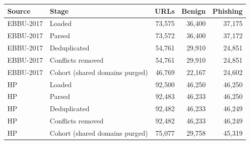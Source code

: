 \begin{tabular}{llrrr}
\toprule
Source & Stage & URLs & Benign & Phishing \\
\midrule
EBBU-2017 & Loaded & 73,575 & 36,400 & 37,175 \\
EBBU-2017 & Parsed & 73,572 & 36,400 & 37,172 \\
EBBU-2017 & Deduplicated & 54,761 & 29,910 & 24,851 \\
EBBU-2017 & Conflicts removed & 54,761 & 29,910 & 24,851 \\
EBBU-2017 & Cohort (shared domains purged) & 46,769 & 22,167 & 24,602 \\
\midrule
HP & Loaded & 92,500 & 46,250 & 46,250 \\
HP & Parsed & 92,483 & 46,233 & 46,250 \\
HP & Deduplicated & 92,482 & 46,233 & 46,249 \\
HP & Conflicts removed & 92,482 & 46,233 & 46,249 \\
HP & Cohort (shared domains purged) & 75,077 & 29,758 & 45,319 \\
\bottomrule
\end{tabular}
